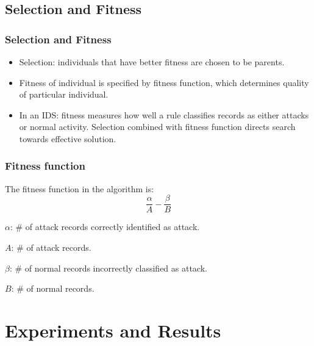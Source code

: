 \documentclass{beamer}
\newcommand{\linespace}{\vskip 0.25cm}
\begin{document}
\subsection{Selection and Fitness}
\begin{frame}
  \frametitle{Selection and Fitness}
	\begin{itemize}
        \item Selection: individuals that have better fitness are chosen to be parents.
        \item Fitness of individual is specified by fitness function, which determines quality of particular individual.
        
        \linespace
        \linespace
        
       	\item In an IDS: fitness measures how well a rule classifies records as either attacks or normal activity. Selection combined with fitness function directs search towards effective solution.
	\end{itemize}
\end{frame}


\begin{frame}
	\frametitle{Fitness function}
	The fitness function in the algorithm is:
	\begin{equation*}
	\frac{\alpha}{A} - \frac{\beta}{B}
	\end{equation*}

	$\alpha$: \# of attack records correctly identified as attack.

	$A$: \# of attack records.

	$\beta$: \# of normal records incorrectly classified as attack.
	
	$B$: \# of normal records.
\end{frame}
\section[Experiments and Results]{Experiments and Results}
\end{document}
